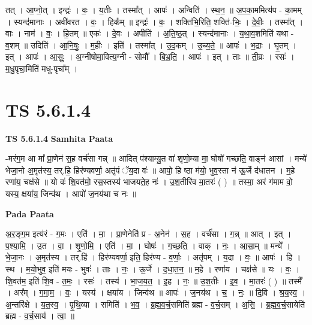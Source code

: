 \documentclass[17pt]{extarticle}
\begin{document}
तत् । आ॒प्नो॒त् । इन्द्रः॑ । वः॒ । य॒तीः । तस्मा᳚त् । आपः॑ । अन्विति॑ । स्थ॒न॒ ॥ अ॒प॒का॒ममित्य॑प - का॒मम् । स्यन्द॑मानाः । अवी॑वरत । वः॒ । हिक᳚म् ॥ इन्द्रः॑ । वः॒ । शक्ति॑भि॒रिति॒ शक्ति॑-भिः॒ । दे॒वीः॒ । तस्मा᳚त् । वाः । नाम॑ । वः॒ । हि॒तम् ॥ एकः॑ । दे॒वः । अपीति॑ । अ॒ति॒ष्ठ॒त् । स्यन्द॑मानाः । य॒था॒व॒शमिति॑ यथा - व॒शम् ॥ उदिति॑ । आ॒नि॒षुः॒ । म॒हीः । इति॑ । तस्मा᳚त् । उ॒द॒कम् । उ॒च्य॒ते॒ ॥ आपः॑ । भ॒द्राः । घृ॒तम् । इत् । आपः॑ । आ॒सुः॒ । अ॒ग्नीषोमा॒वित्य॒ग्नी - सोमौ᳚ । बि॒भ्र॒ति॒ । आपः॑ । इत् । ताः ॥ ती॒व्रः । रसः॑ । म॒धु॒पृचा॒मिति॑ मधु-पृचा᳚म् ।  \newline




\section*{ TS 5.6.1.4 }

\textbf{TS 5.6.1.4 } \newline
\textbf{Samhita Paata} \newline

-मरंग॒म आ मा᳚ प्रा॒णेन॑ स॒ह वर्च॑सा गन्न् ॥ आदित् प॑श्याम्यु॒त वा॑ शृणो॒म्या मा॒ घोषो॑ गच्छति॒ वाङ्न॑ आसां । मन्ये॑ भेजा॒नो अ॒मृत॑स्य॒ तर्.हि॒ हिर॑ण्यवर्णा॒ अतृ॑पं ॅय॒दा वः॑ ॥ आपो॒ हि ष्ठा म॑यो॒ भुव॒स्ता न॑ ऊ॒र्जे द॑धातन । म॒हे रणा॑य॒ चक्ष॑से ॥ यो वः॑ शि॒वत॑मो॒ रस॒स्तस्य॑ भाजयते॒ह नः॑ । उ॒श॒तीरि॑व मा॒तरः॑ ( ) ॥ तस्मा॒ अरं ग॑माम वो॒ यस्य॒ क्षया॑य॒ जिन्व॑थ । आपो॑ ज॒नय॑था च नः ॥ \newline

\textbf{Pada Paata} \newline

अ॒र॒ङ्ग॒म इत्य॑रं - ग॒मः । एति॑ । मा॒ । प्रा॒णेनेति॑ प्र - अ॒नेन॑ । स॒ह । वर्च॑सा । ग॒न्न् ॥ आत् । इत् । प॒श्या॒मि॒ । उ॒त । वा॒ । शृ॒णो॒मि॒ । एति॑ । मा॒ । घोषः॑ । ग॒च्छ॒ति॒ । वाक् । नः॒ । आ॒सा॒म् ॥ मन्ये᳚ । भे॒जा॒नः । अ॒मृत॑स्य । तर्.हि॑ । हिर॑ण्यवर्णा॒ इति॒ हिर॑ण्य - व॒र्णाः॒ । अतृ॑पम् । य॒दा । वः॒ ॥ आपः॑ । हि । स्थ । म॒यो॒भुव॒ इति॑ मयः - भुवः॑ । ताः । नः॒ । ऊ॒र्जे । द॒धा॒त॒न॒ ॥ म॒हे । रणा॑य । चक्ष॑से ॥ यः । वः॒ । शि॒वत॑म॒ इति॑ शि॒व - त॒मः॒ । रसः॑ । तस्य॑ । भा॒ज॒य॒त॒ । इ॒ह । नः॒ ॥ उ॒श॒तीः । इ॒व॒ । मा॒तरः॑ ( ) ॥ तस्मै᳚ । अर᳚म् । ग॒मा॒म॒ । वः॒ । यस्य॑ । क्षया॑य । जिन्व॑थ ॥ आपः॑ । ज॒नय॑थ । च॒ । नः॒ ॥ दि॒वि । श्र॒य॒स्व॒ । अ॒न्तरि॑क्षे । य॒त॒स्व॒ । पृ॒थि॒व्या । समिति॑ । भ॒व॒ । ब्र॒ह्म॒व॒र्च॒समिति॑ ब्रह्म - व॒र्च॒सम् । अ॒सि॒ । ब्र॒ह्म॒व॒र्च॒सायेति॑ ब्रह्म - व॒र्च॒साय॑ । त्वा॒ ॥  \newline
\end{document}
